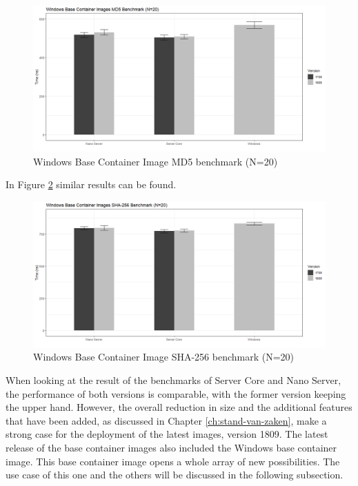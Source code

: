 \begin{figure}[h]
	\captionsetup{width=0.8\linewidth}
	\includegraphics[width=0.9\linewidth]{img/Methodologie/Containers1.png}
	\centering
	\caption[MD5 benchmark]{Windows Base Container Image MD5 benchmark (N=20)}
	\label{fig:MD5}
\end{figure}

In Figure \ref{fig:SHA} similar results can be found. 

\begin{figure}[h]
	\captionsetup{width=0.8\linewidth}
	\includegraphics[width=0.9\linewidth]{img/Methodologie/Containers2.png}
	\centering
	\caption[SHA-256 benchmark]{Windows Base Container Image SHA-256 benchmark (N=20)}
	\label{fig:SHA}
\end{figure}

 When looking at the result of the benchmarks of Server Core and Nano Server, the performance of both versions is comparable, with the former version keeping the upper hand. 
 However, the overall reduction in size and the additional features that have been added, as discussed in Chapter \ref{ch:stand-van-zaken}, make a strong case for the deployment of the latest images, version 1809. 
 The latest release of the base container images also included the Windows base container image. 
 This base container image opens a whole array of new possibilities. 
 The use case of this one and the others will be discussed in the following subsection.

